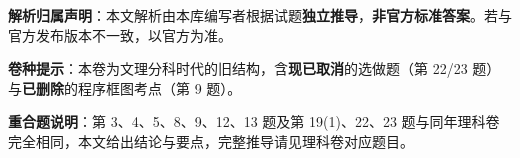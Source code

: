

\begin{gknotice}
\textbf{ 解析归属声明}：本文解析由本库编写者根据试题\textbf{独立推导}，\textbf{非官方标准答案}。若与官方发布版本不一致，以官方为准。

\textbf{ 卷种提示}：本卷为文理分科时代的旧结构，含\textbf{现已取消}的选做题（第 22/23 题）与\textbf{已删除}的程序框图考点（第 9 题）。

\textbf{重合题说明}：第 3、4、5、8、9、12、13 题及第 19(1)、22、23 题与同年理科卷完全相同，本文给出结论与要点，完整推导请见理科卷对应题目。
\end{gknotice}

\par\medskip


